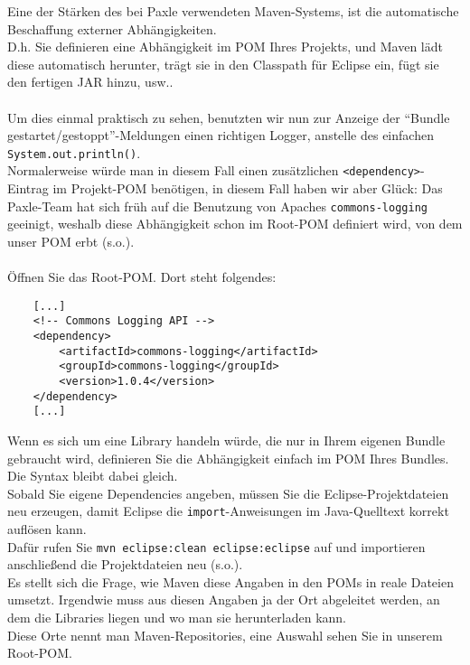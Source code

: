 \documentclass[a4paper,12pt]{scrartcl}
\begin{document}
Eine der Stärken des bei Paxle verwendeten Maven-Systems, ist die automatische Beschaffung externer Abhängigkeiten.\\
D.h. Sie definieren eine Abhängigkeit im POM Ihres Projekts, und Maven lädt diese automatisch herunter, trägt sie in den Classpath für Eclipse ein, fügt sie den fertigen JAR hinzu, usw..\\
\\
Um dies einmal praktisch zu sehen, benutzten wir nun zur Anzeige der "`Bundle gestartet/gestoppt"'-Meldungen einen richtigen Logger, anstelle des einfachen \lstinline[breaklines=false, basicstyle=\itshape]|System.out.println()|.\\
Normalerweise würde man in diesem Fall einen zusätzlichen \lstinline[breaklines=false, basicstyle=\itshape]|<dependency>|-Eintrag im Projekt-POM benötigen, in diesem Fall haben wir aber Glück: Das Paxle-Team hat sich früh auf die Benutzung von Apaches \lstinline[breaklines=false, basicstyle=\itshape]|commons-logging| geeinigt, weshalb diese Abhängigkeit schon im Root-POM definiert wird, von dem unser POM erbt (s.o.).\\
\\
Öffnen Sie das Root-POM. Dort steht folgendes:
\begin{lstlisting}
	[...]
	<!-- Commons Logging API -->
	<dependency>
		<artifactId>commons-logging</artifactId>
		<groupId>commons-logging</groupId>
		<version>1.0.4</version>
	</dependency>
	[...]
\end{lstlisting}
Wenn es sich um eine Library handeln würde, die nur in Ihrem eigenen Bundle gebraucht wird, definieren Sie die Abhängigkeit einfach im POM Ihres Bundles. Die Syntax bleibt dabei gleich.\\
Sobald Sie eigene Dependencies angeben, müssen Sie die Eclipse-Projektdateien neu erzeugen, damit Eclipse die \lstinline[breaklines=false, basicstyle=\itshape]|import|-Anweisungen im Java-Quelltext korrekt auflösen kann.\\
Dafür rufen Sie \lstinline[breaklines=false, basicstyle=\itshape]|mvn eclipse:clean eclipse:eclipse| auf und importieren anschließend die Projektdateien neu (s.o.).\\
Es stellt sich die Frage, wie Maven diese Angaben in den POMs in reale Dateien umsetzt. Irgendwie muss aus diesen Angaben ja der Ort abgeleitet werden, an dem die Libraries liegen und wo man sie herunterladen kann.\\
Diese Orte nennt man Maven-Repositories, eine Auswahl sehen Sie in unserem Root-POM.
\end{document}
